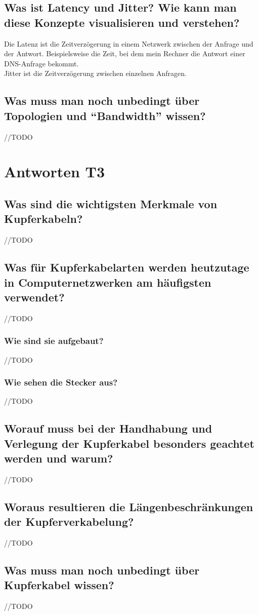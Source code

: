 \subsection*{Was ist \flqq{}Latency\frqq{} und \flqq{}Jitter\frqq? Wie kann man diese Konzepte visualisieren und verstehen?}
Die Latenz ist die Zeitverzögerung in einem Netzwerk zwischen der Anfrage und der Antwort. Beispielsweise die Zeit, bei dem mein Rechner die Antwort einer DNS-Anfrage bekommt.\\
Jitter ist die Zeitverzögerung zwischen einzelnen Anfragen.

\subsection*{Was muss man noch unbedingt über Topologien und "`Bandwidth"' wissen?}
//TODO

\section{Antworten T3}
\subsection*{Was sind die wichtigsten Merkmale von Kupferkabeln?}
//TODO
\subsection*{Was für Kupferkabelarten werden heutzutage in Computernetzwerken am häufigsten verwendet?}
//TODO
\subsubsection*{Wie sind sie aufgebaut?}
//TODO
\subsubsection*{Wie sehen die Stecker aus?}
//TODO
\subsection*{Worauf muss bei der Handhabung und Verlegung der Kupferkabel besonders geachtet werden und warum?}
//TODO
\subsection*{Woraus resultieren die Längenbeschränkungen der Kupferverkabelung?}
//TODO
\subsection*{Was muss man noch unbedingt über Kupferkabel wissen?}
//TODO

